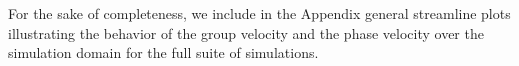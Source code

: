 \documentclass[twocolumn,superscriptaddress,floatfix,preprintnumbers,prd,nofootinbib,aps,10pt]{revtex4-2}
\renewcommand\({\left(}
\renewcommand\){\right)}
\renewcommand\[{\left[}
\renewcommand\]{\right]}
\begin{document}
For the sake of completeness, we include in the Appendix general streamline plots illustrating the behavior of the group velocity and the phase velocity over the simulation domain for the full suite of simulations.


\end{document}
